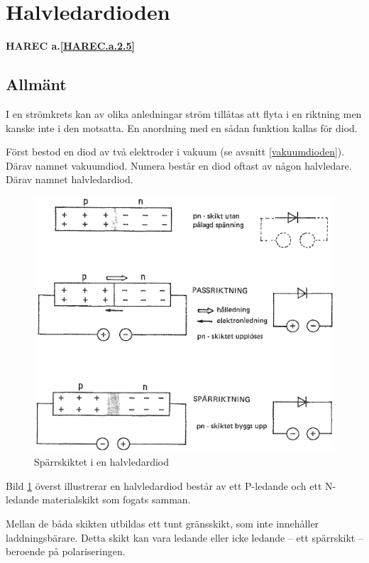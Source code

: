 \section{Halvledardioden}
\textbf{HAREC a.\ref{HAREC.a.2.5}\label{myHAREC.a.2.5}}

\subsection{Allmänt}
I en strömkrets kan av olika anledningar ström tillåtas att flyta i en riktning
men kanske inte i den motsatta. En anordning med en sådan funktion kallas för
diod.

Först bestod en diod av två elektroder i vakuum (se avsnitt
\ref{vakuumdioden}). Därav namnet vakuumdiod.
Numera består en diod oftast av någon halvledare. Därav namnet halvledardiod.

\begin{figure}
\includegraphics[width=\textwidth]{images/cropped_pdfs/bild_2_2-12.pdf}
\caption{Spärrskiktet i en halvledardiod}
\label{fig:BildII2-12}
\end{figure}

Bild \ref{fig:BildII2-12} överst illustrerar en halvledardiod består av ett
P-ledande och ett N-ledande materialskikt som fogats samman.

Mellan de båda skikten utbildas ett tunt gränsskikt, som inte innehåller
laddningsbärare. Detta skikt kan vara ledande eller icke ledande -- ett
spärrskikt -- beroende på polariseringen.

